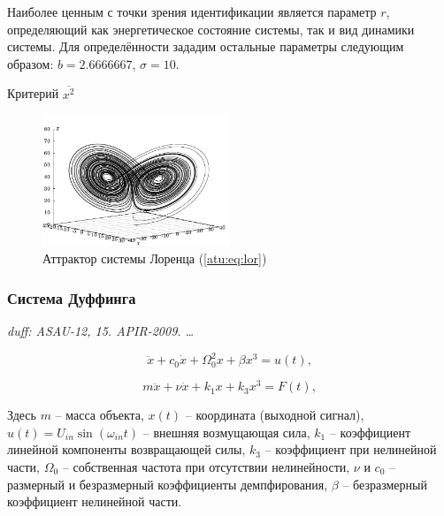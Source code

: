 \documentclass[a4paper,12pt]{article}
\newcommand{\LinkRef}[1]{ \textit{#1} }
\begin{document}
Наиболее ценным с точки зрения идентификации является параметр
$r$, определяющий как энергетическое состояние системы,
так и вид динамики системы.
Для определённости зададим остальные параметры следующим образом:
$b = 2.6666667$, $\sigma = 10$.

Критерий
$\overline{x^2}$


%


\begin{figure}[htb!]
\centerline{\includegraphics[width=0.5\textwidth]{p/cha/lor_phase3.pdf} }
\caption{Аттрактор системы Лоренца (\ref{atu:eq:lor})}
\label{atu:f:lor_phase}
\end{figure}


\FloatBarrier
\subsubsection{Система Дуффинга} %

\LinkRef{
 duff: ASAU-12, 15. APIR-2009. \ldots
}

\begin{equation}
 \ddot{x} + c_0 \dot{x} + \Omega_0^2 x + \beta x^3 = u(t) ,
\label{atu:eq:duff}
\end{equation}

\begin{equation}
 m \ddot{x} + \nu \dot{x} + k_1 x + k_3 x^3 = F(t) ,
\label{atu:eq:duff_phys}
\end{equation}

Здесь \(m\) -- масса объекта,
\(x(t)\) -- координата (выходной сигнал),
\(u(t) = U_{in} \sin( \omega_{in} t ) \) -- внешняя возмущающая сила,
\( k_1 \) -- коэффициент линейной компоненты возвращающей силы,
\( k_3 \) -- коэффициент при нелинейной части,
\( \Omega_0 \) -- собственная частота при отсутствии нелинейности,
\( \nu \) и \( c_0\) -- размерный и безразмерный коэффициенты демпфирования,
\( \beta \) -- безразмерный коэффициент нелинейной части.
\end{document}
